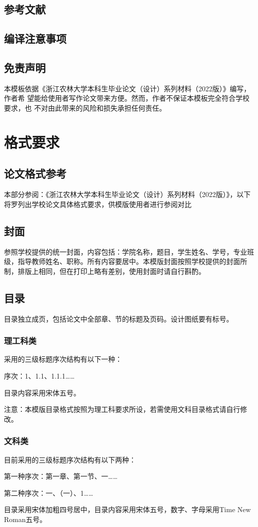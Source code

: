 \documentclass[AutoFakeBold]{ZafuThesis}
\begin{document}
\subsection{参考文献}
\subsection{编译注意事项}
\subsection{免责声明}
本模板依据《浙江农林大学本科生毕业论文（设计）系列材料（2022版）》编写，作者希 望能给使用者写作论文带来方便。然而，作者不保证本模板完全符合学校要求，也 不对由此带来的风险和损失承担任何责任。
\section{格式要求}
\subsection{论文格式参考}
本部分参阅：《浙江农林大学本科生毕业论文（设计）系列材料（2022版）》，以下将罗列出学校论文具体格式要求，供模版使用者进行参阅对比\par
\subsection{封面}
参照学校提供的统一封面，内容包括：学院名称，题目，学生姓名、学号，专业班级，指导教师姓名、职称。所有内容要居中。本模版封面按照学校提供的封面所制，排版上相同，但在打印上略有差别，使用封面时请自行斟酌。
\subsection{目录}
目录独立成页，包括论文中全部章、节的标题及页码。设计图纸要有标号。
\subsubsection{理工科类}

采用的三级标题序次结构有以下一种：\par
序次：1、1.1、1.1.1……\par
目录内容采用宋体五号。\par
注意：本模版目录格式按照为理工科要求所设，若需使用文科目录格式请自行修改。
\subsubsection{文科类}
目前采用的三级标题序次结构有以下两种：\par
第一种序次：第一章、第一节、一……\par
第二种序次：一、（一）、1……\par
目录采用宋体加粗四号居中，目录内容采用宋体五号，数字、字母采用Time New Roman五号。
\end{document}
